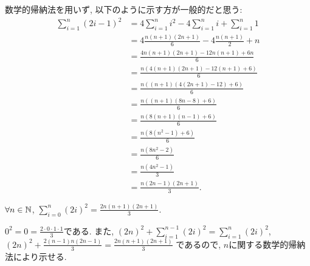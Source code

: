 \begin{rem}
  数学的帰納法を用いず, 以下のように示す方が一般的だと思う:
  \begin{align*}
    \sum_{i=1}^{n}(2i-1)^2&=
    4\sum_{i=1}^{n}i^2-4\sum_{i=1}^n i+\sum_{i=1}^n 1\\
    &=
    4\frac{n(n+1)(2n+1)}{6}
    -4\frac{n(n+1)}{2}+n\\
    &=\frac{4n(n+1)(2n+1)-12n(n+1)+6n}{6}\\
    &=\frac{n(4(n+1)(2n+1)-12(n+1)+6)}{6}\\
    &=\frac{n((n+1)(4(2n+1)-12)+6)}{6}\\
    &=\frac{n((n+1)(8n-8)+6)}{6}\\
    &=\frac{n(8(n+1)(n-1)+6)}{6}\\
    &=\frac{n(8(n^2-1)+6)}{6}\\
    &=\frac{n(8n^2-2)}{6}\\
    &=\frac{n(4n^2-1)}{3}\\
    &=\frac{n(2n-1)(2n+1)}{3}.
  \end{align*}
\end{rem}


\begin{prop}
  $\forall n\in\mathbb{N}$, $\sum_{i=0}^{n}(2i)^2=\frac{2n(n+1)(2n+1)}{3}$.
\end{prop}
\begin{proof**}
  $0^2=0=\frac{2\cdot 0\cdot 1\cdot 1}{3}$である.
  また,
    $(2n)^2+\sum_{i=1}^{n-1}(2i)^2=\sum_{i=1}^{n}(2i)^2$,
    $(2n)^2+\frac{2(n-1)n(2n-1)}{3}=\frac{2n(n+1)(2n+1)}{3}$
  であるので,
  $n$に関する数学的帰納法により示せる.
\end{proof**}



